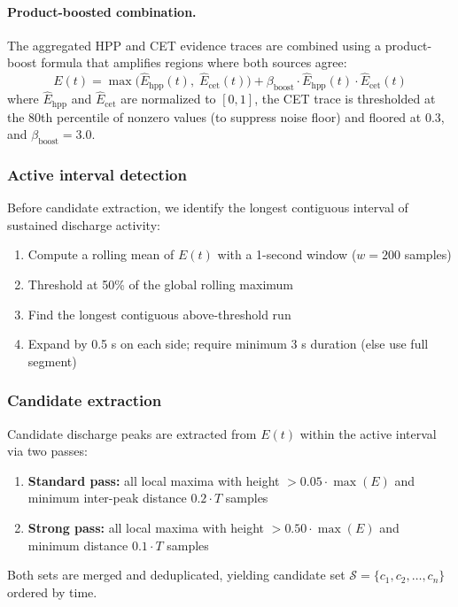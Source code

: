 \paragraph{Product-boosted combination.}
The aggregated HPP and CET evidence traces are combined using a product-boost formula that amplifies regions where both sources agree:
\[ E(t) = \max\!\big(\hat{E}_{\mathrm{hpp}}(t),\; \hat{E}_{\mathrm{cet}}(t)\big) + \beta_{\mathrm{boost}} \cdot \hat{E}_{\mathrm{hpp}}(t) \cdot \hat{E}_{\mathrm{cet}}(t) \tag{6} \]
where $\hat{E}_{\mathrm{hpp}}$ and $\hat{E}_{\mathrm{cet}}$ are normalized to $[0, 1]$, the CET trace is thresholded at the 80th percentile of nonzero values (to suppress noise floor) and floored at 0.3, and $\beta_{\mathrm{boost}} = 3.0$.

\subsubsection{Active interval detection}

Before candidate extraction, we identify the longest contiguous interval of sustained discharge activity:
\begin{enumerate}
  \item Compute a rolling mean of $E(t)$ with a 1-second window ($w = 200$ samples)
  \item Threshold at 50\% of the global rolling maximum
  \item Find the longest contiguous above-threshold run
  \item Expand by 0.5 s on each side; require minimum 3 s duration (else use full segment)
\end{enumerate}

\subsubsection{Candidate extraction}

Candidate discharge peaks are extracted from $E(t)$ within the active interval via two passes:
\begin{enumerate}
  \item \textbf{Standard pass:} all local maxima with height $> 0.05 \cdot \max(E)$ and minimum inter-peak distance $0.2 \cdot T$ samples
  \item \textbf{Strong pass:} all local maxima with height $> 0.50 \cdot \max(E)$ and minimum distance $0.1 \cdot T$ samples
\end{enumerate}
Both sets are merged and deduplicated, yielding candidate set $\mathcal{S} = \{c_1, c_2, \ldots, c_n\}$ ordered by time.

